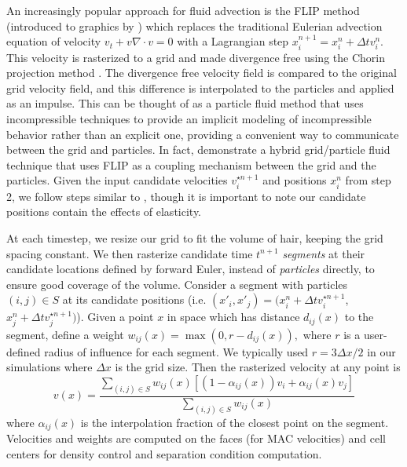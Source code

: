 An increasingly popular approach for fluid advection is the FLIP method
(introduced to graphics by \cite{zhu:2005:sand}) which replaces the traditional
Eulerian advection equation of velocity $v_t+v \nabla\cdot v=0$ with a
Lagrangian step $x_i^{n+1}=x_i^n+\Delta t v^n_i$. This velocity is
rasterized to a grid and made divergence free using the Chorin
projection method \cite{chorin:1967:ANM}. The divergence free velocity field is compared to the
original grid velocity field, and this difference is interpolated to the
particles and applied as an impulse.  This can be thought of as a
particle fluid method
that uses incompressible techniques to provide an implicit modeling of
incompressible behavior rather than an explicit one,
providing a convenient way to
communicate between the grid and particles. In fact, \cite{losasso:2007:sph}
demonstrate a hybrid grid/particle fluid technique that uses FLIP as a coupling
mechanism between the grid and the particles. Given the input candidate velocities $v^{\star n+1}_i$ and positions
$x^n_i$ from step 2, we follow steps similar to \cite{losasso:2007:sph},
though it is important to note our candidate positions contain the effects of
elasticity. 

At each timestep, we resize our grid to fit the volume of hair,
keeping the grid spacing constant.  We then rasterize candidate time
$t^{n+1}$ \emph{segments} at their candidate locations defined
by forward Euler, instead of \emph{particles} directly, to ensure good coverage of the
volume.  Consider a segment with particles $(i,j)\in S$ at its candidate
positions (i.e. $(x'_i,x'_j)=(x^n_i+\Delta t v^{\star n+1}_i$,$x^n_j+\Delta t
v_j^{\star n+1})$). Given a point $x$ in space which has distance $d_{ij}(x)$ to the
segment, define a weight 
$w_{ij}(x)=\max\left(0,r-d_{ij}(x)\right),$
where $r$ is a user-defined radius of influence for each segment.  We typically
used $r=3\Delta x/2$ in our simulations where $\Delta x$ is the grid
size. Then the rasterized velocity at any point is
$$v(x)= \frac{\sum_{(i,j)\in S} w_{ij}(x)[ (1-\alpha_{ij}(x)) v_i +
    \alpha_{ij}(x) v_j ]}{\sum_{(i,j)\in S} w_{ij}(x)}$$
where $\alpha_{ij}(x)$ is the interpolation fraction of the closest point on the
segment. Velocities and weights are computed on the faces (for MAC velocities)
and cell centers for density control and separation condition computation. 


